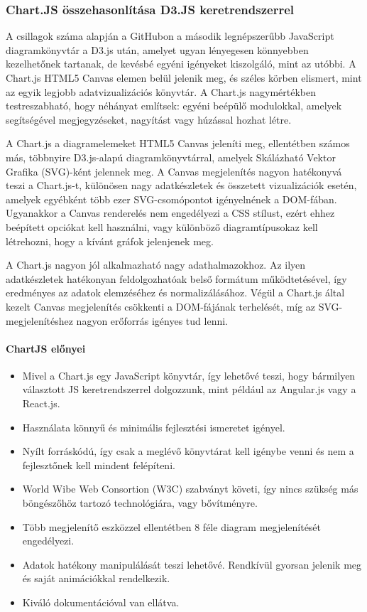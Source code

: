 \subsubsection{Chart.JS összehasonlítása D3.JS keretrendszerrel}
A csillagok száma alapján a GitHubon a második legnépszerűbb JavaScript diagramkönyvtár a D3.js után, amelyet ugyan lényegesen könnyebben kezelhetőnek tartanak, de kevésbé egyéni igényeket kiszolgáló, mint az utóbbi. A Chart.js HTML5 Canvas elemen belül jelenik meg, és széles körben elismert, mint az egyik legjobb adatvizualizációs könyvtár.
A Chart.js nagymértékben testreszabható, hogy néhányat említsek: egyéni beépülő modulokkal, amelyek segítségével megjegyzéseket, nagyítást vagy húzással hozhat létre.

	A Chart.js a diagramelemeket HTML5 Canvas jeleníti meg, ellentétben számos más, többnyire D3.js-alapú diagramkönyvtárral, amelyek Skálázható Vektor Grafika (SVG)-ként jelennek meg. A Canvas megjelenítés nagyon hatékonyvá teszi a Chart.js-t, különösen nagy adatkészletek és összetett vizualizációk esetén, amelyek egyébként több ezer SVG-csomópontot igényelnének a DOM-fában. Ugyanakkor a Canvas renderelés nem engedélyezi a CSS stílust, ezért ehhez beépített opciókat kell használni, vagy különböző diagramtípusokaz kell létrehozni, hogy a kívánt gráfok jelenjenek meg. 

	A Chart.js nagyon jól alkalmazható nagy adathalmazokhoz. Az ilyen adatkészletek hatékonyan feldolgozhatóak belső formátum működtetésével, így eredményes az adatok elemzéséhez és normalizálásához. Végül a Chart.js által kezelt Canvas megjelenítés csökkenti a DOM-fájának terhelését, míg az SVG-megjelenítéshez nagyon erőforrás igényes tud lenni. \cite{wikiChart}

\pagebreak

\paragraph{ChartJS előnyei}

\begin{itemize}
\item Mivel a Chart.js egy JavaScript könyvtár, így lehetővé teszi, hogy bármilyen választott JS keretrendszerrel dolgozzunk, mint például az Angular.js vagy a React.js.
\item Használata könnyű és minimális fejlesztési ismeretet igényel.
\item Nyílt forráskódú, így csak a meglévő könyvtárat kell igénybe venni és nem a fejlesztőnek kell mindent felépíteni.
\item World Wibe Web Consortion (W3C) szabványt követi, így nincs szükség más böngészőhöz tartozó technológiára, vagy bővítményre.
\item Több megjelenítő eszközzel ellentétben 8 féle diagram megjelenítését engedélyezi.
\item Adatok hatékony manipulálását teszi lehetővé. Rendkívül gyorsan jelenik meg és saját animációkkal rendelkezik.
\item Kiváló dokumentációval van ellátva.
\end{itemize}
